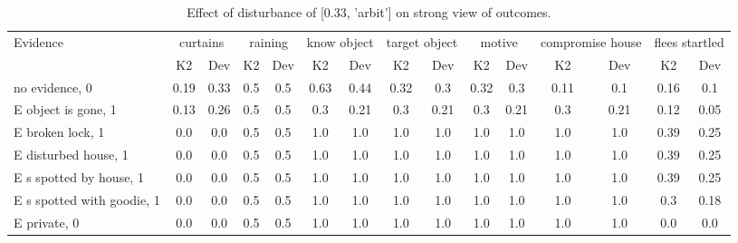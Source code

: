 \begin{table}\begin{tabular}{l|cc|cc|cc|cc|cc|cc|cc}\toprule\multirow{2}{*}{Evidence} & \multicolumn{2}{c}{curtains}& \multicolumn{2}{c}{raining}& \multicolumn{2}{c}{know object}& \multicolumn{2}{c}{target object}& \multicolumn{2}{c}{motive}& \multicolumn{2}{c}{compromise house}& \multicolumn{2}{c}{flees startled}\\& {K2} & {Dev}& {K2} & {Dev}& {K2} & {Dev}& {K2} & {Dev}& {K2} & {Dev}& {K2} & {Dev}& {K2} & {Dev}\\\midrule
no evidence, 0 & \cellcolor{Bittersweet}0.19&\cellcolor{Bittersweet}0.33&0.5&0.5&\cellcolor{Bittersweet}0.63&\cellcolor{Bittersweet}0.44&0.32&0.3&0.32&0.3&0.11&0.1&\cellcolor{Bittersweet}0.16&\cellcolor{Bittersweet}0.1\\E object is gone, 1 & \cellcolor{Bittersweet}0.13&\cellcolor{Bittersweet}0.26&0.5&0.5&\cellcolor{Bittersweet}0.3&\cellcolor{Bittersweet}0.21&\cellcolor{Bittersweet}0.3&\cellcolor{Bittersweet}0.21&\cellcolor{Bittersweet}0.3&\cellcolor{Bittersweet}0.21&\cellcolor{Bittersweet}0.3&\cellcolor{Bittersweet}0.21&\cellcolor{Bittersweet}0.12&\cellcolor{Bittersweet}0.05\\E broken lock, 1 & 0.0&0.0&0.5&0.5&1.0&1.0&1.0&1.0&1.0&1.0&1.0&1.0&\cellcolor{Bittersweet}0.39&\cellcolor{Bittersweet}0.25\\E disturbed house, 1 & 0.0&0.0&0.5&0.5&1.0&1.0&1.0&1.0&1.0&1.0&1.0&1.0&\cellcolor{Bittersweet}0.39&\cellcolor{Bittersweet}0.25\\E s spotted by house, 1 & 0.0&0.0&0.5&0.5&1.0&1.0&1.0&1.0&1.0&1.0&1.0&1.0&\cellcolor{Bittersweet}0.39&\cellcolor{Bittersweet}0.25\\E s spotted with goodie, 1 & 0.0&0.0&0.5&0.5&1.0&1.0&1.0&1.0&1.0&1.0&1.0&1.0&\cellcolor{Bittersweet}0.3&\cellcolor{Bittersweet}0.18\\E private, 0 & 0.0&0.0&0.5&0.5&1.0&1.0&1.0&1.0&1.0&1.0&1.0&1.0&0.0&0.0\\\bottomrule\end{tabular}\caption{Effect of disturbance of [0.33, 'arbit'] on strong view of outcomes.}\end{table}